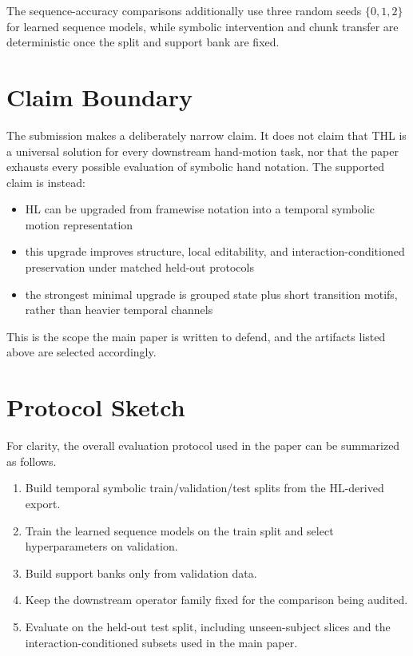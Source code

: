 \documentclass[letterpaper]{article}
\begin{document}
The sequence-accuracy comparisons additionally use three random seeds
$\{0,1,2\}$ for learned sequence models, while symbolic intervention and chunk
transfer are deterministic once the split and support bank are fixed.

\section{Claim Boundary}

The submission makes a deliberately narrow claim. It does not claim that THL is
a universal solution for every downstream hand-motion task, nor that the paper
exhausts every possible evaluation of symbolic hand notation. The supported
claim is instead:
\begin{itemize}
    \item HL can be upgraded from framewise notation into a temporal symbolic
    motion representation
    \item this upgrade improves structure, local editability, and
    interaction-conditioned preservation under matched held-out protocols
    \item the strongest minimal upgrade is grouped state plus short transition
    motifs, rather than heavier temporal channels
\end{itemize}

This is the scope the main paper is written to defend, and the artifacts listed
above are selected accordingly.

\section{Protocol Sketch}

For clarity, the overall evaluation protocol used in the paper can be summarized
as follows.
\begin{enumerate}
    \item Build temporal symbolic train/validation/test splits from the
    HL-derived export.
    \item Train the learned sequence models on the train split and select
    hyperparameters on validation.
    \item Build support banks only from validation data.
    \item Keep the downstream operator family fixed for the comparison being
    audited.
    \item Evaluate on the held-out test split, including unseen-subject slices
    and the interaction-conditioned subsets used in the main paper.
\end{enumerate}
\end{document}
